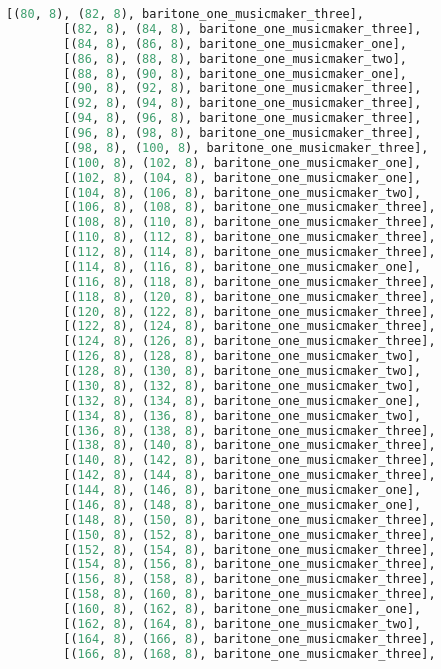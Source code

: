 \begin{lstlisting}[language=Python, caption=Invocation Source Code]
        [(80, 8), (82, 8), baritone_one_musicmaker_three],
        [(82, 8), (84, 8), baritone_one_musicmaker_three],
        [(84, 8), (86, 8), baritone_one_musicmaker_one],
        [(86, 8), (88, 8), baritone_one_musicmaker_two],
        [(88, 8), (90, 8), baritone_one_musicmaker_one],
        [(90, 8), (92, 8), baritone_one_musicmaker_three],
        [(92, 8), (94, 8), baritone_one_musicmaker_three],
        [(94, 8), (96, 8), baritone_one_musicmaker_three],
        [(96, 8), (98, 8), baritone_one_musicmaker_three],
        [(98, 8), (100, 8), baritone_one_musicmaker_three],
        [(100, 8), (102, 8), baritone_one_musicmaker_one],
        [(102, 8), (104, 8), baritone_one_musicmaker_one],
        [(104, 8), (106, 8), baritone_one_musicmaker_two],
        [(106, 8), (108, 8), baritone_one_musicmaker_three],
        [(108, 8), (110, 8), baritone_one_musicmaker_three],
        [(110, 8), (112, 8), baritone_one_musicmaker_three],
        [(112, 8), (114, 8), baritone_one_musicmaker_three],
        [(114, 8), (116, 8), baritone_one_musicmaker_one],
        [(116, 8), (118, 8), baritone_one_musicmaker_three],
        [(118, 8), (120, 8), baritone_one_musicmaker_three],
        [(120, 8), (122, 8), baritone_one_musicmaker_three],
        [(122, 8), (124, 8), baritone_one_musicmaker_three],
        [(124, 8), (126, 8), baritone_one_musicmaker_three],
        [(126, 8), (128, 8), baritone_one_musicmaker_two],
        [(128, 8), (130, 8), baritone_one_musicmaker_two],
        [(130, 8), (132, 8), baritone_one_musicmaker_two],
        [(132, 8), (134, 8), baritone_one_musicmaker_one],
        [(134, 8), (136, 8), baritone_one_musicmaker_two],
        [(136, 8), (138, 8), baritone_one_musicmaker_three],
        [(138, 8), (140, 8), baritone_one_musicmaker_three],
        [(140, 8), (142, 8), baritone_one_musicmaker_three],
        [(142, 8), (144, 8), baritone_one_musicmaker_three],
        [(144, 8), (146, 8), baritone_one_musicmaker_one],
        [(146, 8), (148, 8), baritone_one_musicmaker_one],
        [(148, 8), (150, 8), baritone_one_musicmaker_three],
        [(150, 8), (152, 8), baritone_one_musicmaker_three],
        [(152, 8), (154, 8), baritone_one_musicmaker_three],
        [(154, 8), (156, 8), baritone_one_musicmaker_three],
        [(156, 8), (158, 8), baritone_one_musicmaker_three],
        [(158, 8), (160, 8), baritone_one_musicmaker_three],
        [(160, 8), (162, 8), baritone_one_musicmaker_one],
        [(162, 8), (164, 8), baritone_one_musicmaker_two],
        [(164, 8), (166, 8), baritone_one_musicmaker_three],
        [(166, 8), (168, 8), baritone_one_musicmaker_three],

\end{lstlisting}
